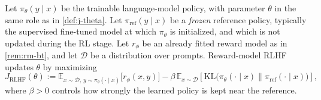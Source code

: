 \documentclass[11pt,a4paper]{article}
\theoremstyle{definition}
\begin{document}
\begin{definition}\label{def:j-rlhf}
Let $\pi_\theta(y\mid x)$ be the trainable language-model policy, with parameter $\theta$
in the same role as in \cref{def:j-theta}. Let $\pi_{\mathrm{ref}}(y\mid x)$ be a
\emph{frozen} reference policy, typically the supervised fine-tuned model at which
$\pi_\theta$ is initialized, and which is not updated during the RL stage. Let $r_\phi$
be an already fitted reward model as in \cref{rem:rm-bt}, and let $\mathcal{D}$ be a
distribution over prompts. Reward-model RLHF updates $\theta$ by maximizing
\[
J_{\mathrm{RLHF}}(\theta)
:=
\mathbb{E}_{x\sim\mathcal{D},\,y\sim\pi_\theta(\cdot\mid x)}
\bigl[r_\phi(x,y)\bigr]
-\beta\,
\mathbb{E}_{x\sim\mathcal{D}}
\left[
\mathrm{KL}\bigl(
\pi_\theta(\cdot\mid x)
\mathbin{\|}\pi_{\mathrm{ref}}(\cdot\mid x)
\bigr)
\right],
\]
where $\beta>0$ controls how strongly the learned policy is kept near the reference.
\end{definition}
\end{document}

